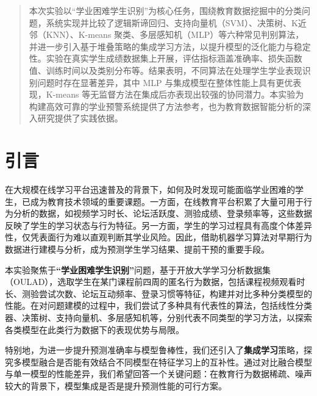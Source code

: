 \documentclass[a4paper, utf8]{ctexart}
\renewcommand*{\songti}{\CJKfamily{zhsong}}
\begin{document}
	\maketitle
	
	\renewcommand{\abstractname}{\large \textbf{摘要}}
	\begin{abstract}
		本次实验以“学业困难学生识别”为核心任务，围绕教育数据挖掘中的分类问题，系统实现并比较了逻辑斯谛回归、支持向量机（SVM）、决策树、K近邻（KNN）、K-means 聚类、多层感知机（MLP）等六种常见判别算法，并进一步引入基于堆叠策略的集成学习方法，以提升模型的泛化能力与稳定性。实验在真实学生成绩数据集上开展，评估指标涵盖准确率、损失函数值、训练时间以及类别分布等。结果表明，不同算法在处理学生学业表现识别问题时存在显著差异，其中 MLP 与集成模型在整体性能上具有更优表现，K-means 等无监督方法在集成后亦表现出较强的协同潜力。本实验为构建高效可靠的学业预警系统提供了方法参考，也为教育数据智能分析的深入研究提供了实践依据。
		
	\end{abstract}
	
	\section{引言}
	
	在大规模在线学习平台迅速普及的背景下，如何及时发现可能面临学业困难的学生，已成为教育技术领域的重要课题\cite{ref5,ref18,ref20}。一方面，在线教育平台积累了大量可用于行为分析的数据，如视频学习时长、论坛活跃度、测验成绩、登录频率等，这些数据反映了学生的学习状态与行为特征\cite{ref14,ref15}。另一方面，学生的学习过程具有高度个体差异性，仅凭表面行为难以直观判断其学业风险。因此，借助机器学习算法对早期行为数据进行建模与分析，成为预测学生学习结果、提前干预的重要手段\cite{ref13,ref19,ref24}。
	
	本实验聚焦于\textbf{\songti “学业困难学生识别”}问题，基于开放大学学习分析数据集（OULAD），选取学生在某门课程前四周的匿名行为数据，包括课程视频观看时长、测验尝试次数、论坛互动频率、登录习惯等特征，构建并对比多种分类模型的性能。在对问题建模的过程中，我们尝试了多种具有代表性的算法，包括线性分类器、决策树、支持向量机、多层感知机等，分别代表不同类型的学习方法，以探索各类模型在此类行为数据下的表现优势与局限\cite{ref3,ref7,ref10,ref23}。
	
	特别地，为进一步提升预测准确率与模型鲁棒性，我们还引入了\textbf{\songti 集成学习}策略，探究多模型融合是否能有效结合不同模型在特征学习上的互补性\cite{ref6,ref9,ref25}。通过对比融合模型与单一模型的性能差异，我们希望回答一个关键问题：在教育行为数据稀疏、噪声较大的背景下，模型集成是否是提升预测性能的可行方案\cite{ref16,ref26}。
	
\end{document}
